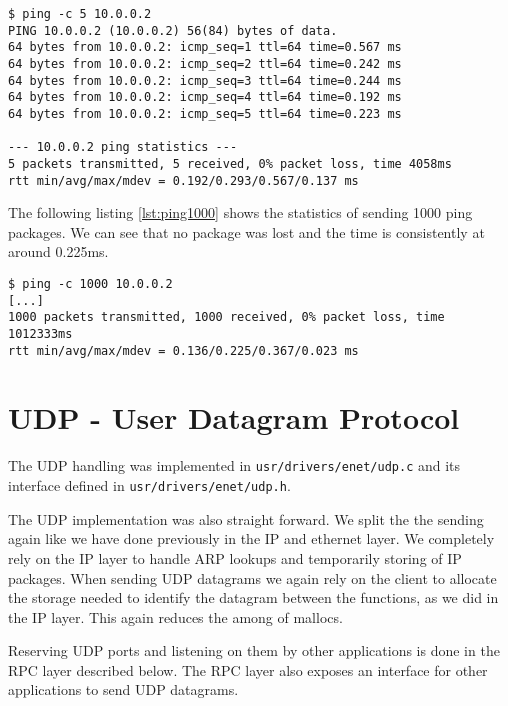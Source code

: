 \begin{lstlisting}[caption=Ping Toradex Board 5 times, label=lst:ping5]
$ ping -c 5 10.0.0.2
PING 10.0.0.2 (10.0.0.2) 56(84) bytes of data.
64 bytes from 10.0.0.2: icmp_seq=1 ttl=64 time=0.567 ms
64 bytes from 10.0.0.2: icmp_seq=2 ttl=64 time=0.242 ms
64 bytes from 10.0.0.2: icmp_seq=3 ttl=64 time=0.244 ms
64 bytes from 10.0.0.2: icmp_seq=4 ttl=64 time=0.192 ms
64 bytes from 10.0.0.2: icmp_seq=5 ttl=64 time=0.223 ms

--- 10.0.0.2 ping statistics ---
5 packets transmitted, 5 received, 0% packet loss, time 4058ms
rtt min/avg/max/mdev = 0.192/0.293/0.567/0.137 ms
\end{lstlisting}

The following listing \ref{lst:ping1000} shows the statistics of sending 1000 ping packages. We can see that no package was lost and the time is consistently at around 0.225ms.

\begin{lstlisting}[caption=Ping Toradex Board 1000 times, label=lst:ping1000]
$ ping -c 1000 10.0.0.2
[...]
1000 packets transmitted, 1000 received, 0% packet loss, time 1012333ms
rtt min/avg/max/mdev = 0.136/0.225/0.367/0.023 ms
\end{lstlisting}

\section{UDP - User Datagram Protocol}
The UDP handling was implemented in \verb|usr/drivers/enet/udp.c| and its interface defined in \verb|usr/drivers/enet/udp.h|.

The UDP implementation was also straight forward. We split the the sending again like we have done previously in the IP and ethernet layer. We completely rely on the IP layer to handle ARP lookups and temporarily storing of IP packages. When sending UDP datagrams we again rely on the client to allocate the storage needed to identify the datagram between the functions, as we did in the IP layer. This again reduces the among of mallocs.

Reserving UDP ports and listening on them by other applications is done in the RPC layer described below. The RPC layer also exposes an interface for other applications to send UDP datagrams.

